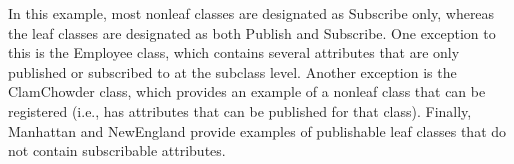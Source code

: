 In this example, most nonleaf classes are designated as Subscribe only, whereas the leaf classes are designated as both Publish and Subscribe. One exception to this is the Employee class, which contains several attributes that are only published or subscribed to at the subclass level. Another exception is the ClamChowder class, which provides an example of a nonleaf class that can be registered (i.e., has attributes that can be published for that class). Finally, Manhattan and NewEngland provide examples of publishable leaf classes that do not contain subscribable attributes.

\newpage
{}
\vspace{-9pt}
